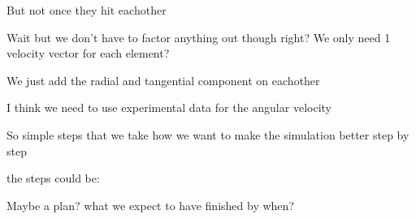 \documentclass[11pt, english]{article}
\begin{document}
But not once they hit eachother

Wait but we don't have to factor anything out though right? We only need 1 velocity vector for each element?

We just add the radial and tangential component on eachother

I think we need to use experimental data for the angular velocity

So simple steps that we take  how we want to make the simulation better step by step


the steps could be:



Maybe a plan? what we expect to have finished by when?


\printbibliography[heading=bibintoc,title={Refernces}]
\end{document}
